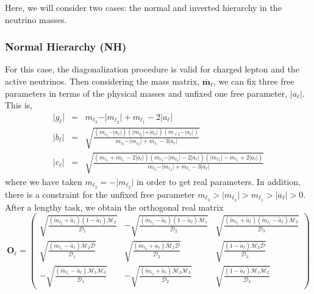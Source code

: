 \documentclass[aps,prd,groupaddress,floatfix,tighten,nofootinbib,showpacs,amsfonts,superscriptaddress]{revtex4-2}
\newcommand{\nn}{\nonumber}
\begin{document}
Here, we will consider two cases: the normal and inverted hierarchy in the neutrino masses.

\subsubsection{Normal Hierarchy (NH)}
For this case, the diagonalization procedure is valid for charged lepton and the active neutrinos. Then considering the mass matrix, $\bar{\mathbf{m}}_{\ell}$,  we can fix three free parameters in terms of the physical masses and unfixed one free parameter, $\vert a_{\ell}\vert$. This is,
\begin{eqnarray}
\vert g_{\ell}\vert&=& m_{\ell_{3}}-\vert m_{\ell_{2}}\vert+m_{\ell_{1}}-2\vert a_{\ell}\vert\nn\\
\vert b_{\ell}\vert&=&\sqrt{\frac{(m_{\ell_{3}}-\vert a_{\ell}\vert)(\vert m_{\ell_{2}}\vert+\vert a_{\ell}\vert)(m_{\ell{1}}-\vert a_{\ell}\vert)}{m_{\ell_{3}}-\vert m_{\ell_{2}}\vert+m_{\ell_{1}}-3\vert a_{\ell}\vert}}\nn\\
\vert c_{\ell}\vert&=&\sqrt{\frac{(m_{\ell_{3}}+m_{\ell_{1}}-2\vert a_{\ell}\vert)(m_{\ell_{3}}-\vert m_{\ell_{2}}\vert-2\vert a_{\ell}\vert)(\vert m_{\ell_{2}}\vert-m_{\ell_{1}}+2\vert a_{\ell}\vert)}{m_{\ell_{3}}-\vert m_{\ell_{2}}\vert +m_{\ell_{1}}-3\vert a_{\ell}\vert}}\label{fpno}
\end{eqnarray}
 where we have taken $m_{\ell_{2}}=-\vert m_{\ell_{2}}\vert$ in order to get real parameters. In addition, there is a constraint for the unfixed free parameter $m_{\ell_{3}}>\vert m_{\ell_{2}}\vert>m_{\ell_{1}}>\vert a_{\ell}\vert>0$. After a lengthy task, we obtain the orthogonal real matrix
\begin{equation}
\mathbf{O}_{\ell}=\begin{pmatrix}
\sqrt{\frac{( \tilde{m}_{\ell_{2}}+\tilde{a}_{\ell})(1-\tilde{a}_{\ell})\mathcal{M}_{2}}{\mathcal{D}_{1}}}& -\sqrt{\frac{(\tilde{m}_{\ell_{1}}-\tilde{a}_{\ell})(1-\tilde{a}_{\ell})\mathcal{M}_{1}}{\mathcal{D}_{2}}}
& \sqrt{\frac{(\tilde{m}_{\ell_{2}}+\tilde{a}_{\ell})(\tilde{m}_{\ell_{1}}-\tilde{a}_{\ell})\mathcal{M}_{3}}{\mathcal{D}_{3}}} 
\\ 
\sqrt{\frac{(\tilde{m}_{\ell_{1}}-\tilde{a}_{\ell})\mathcal{M}_{2}\mathcal{D}}{\mathcal{D}_{1}}}& \sqrt{\frac{(\tilde{m}_{\ell_{2}}+\tilde{a}_{\ell})\mathcal{M}_{1}\mathcal{D}}{\mathcal{D}_{2}}}
& \sqrt{\frac{(1-\tilde{a}_{\ell})\mathcal{M}_{3}\mathcal{D}}{\mathcal{D}_{3}}} \\ 
-\sqrt{\frac{(\tilde{m}_{\ell_{1}}-\tilde{a}_{\ell})\mathcal{M}_{1}\mathcal{M}_{3}}{\mathcal{D}_{1}}}&-\sqrt{\frac{(\tilde{m}_{\ell_{2}}+\tilde{a}_{\ell})\mathcal{M}_{2}\mathcal{M}_{3}}{\mathcal{D}_{2}}} 
& 
\sqrt{\frac{(1-\tilde{a}_{\ell})\mathcal{M}_{1}\mathcal{M}_{2}}{\mathcal{D}_{3}}}
\label{eq7}
\end{pmatrix} 
\end{equation}
\end{document}
